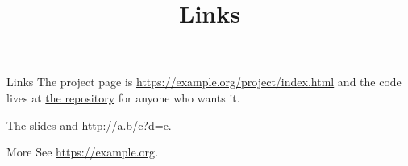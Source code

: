 \documentclass{beamer}
\title{Links}
\begin{document}
\begin{frame}{Links}
The project page is \url{https://example.org/project/index.html} and the code lives at \href{https://github.com/example/code}{the repository} for anyone who wants it.

\href{slides.pdf}{The slides} and \url{http://a.b/c?d=e}.
\begin{block}{More}
See \url{https://example.org}.
\end{block}
\end{frame}
\end{document}

